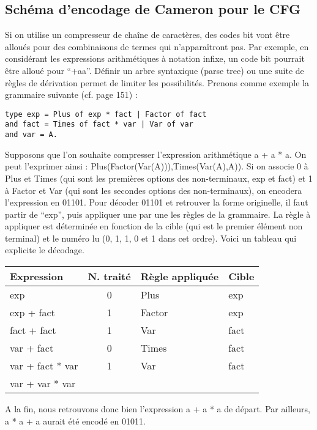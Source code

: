 \documentclass[titlepage]{article}
\begin{document}
\subsection{Schéma d'encodage de Cameron pour le CFG}

Si on utilise un compresseur de chaîne de caractères, des codes bit vont être alloués pour des combinaisons de termes qui n'apparaîtront pas. Par exemple, en considérant les expressions arithmétiques à notation infixe, un code bit pourrait être alloué pour ``+aa''.
Définir un arbre syntaxique (parse tree) ou une suite de règles de dérivation permet de limiter les possibilités.
Prenons comme exemple la grammaire suivante (cf. page 151) :
\begin{lstlisting}
type exp = Plus of exp * fact | Factor of fact
and fact = Times of fact * var | Var of var
and var = A.
\end{lstlisting} 
Supposons que l'on souhaite compresser l'expression arithmétique a + a * a. On peut l'exprimer ainsi : Plus(Factor(Var(A))),Times(Var(A),A)). Si on associe 0 à Plus et Times (qui sont les premières options des non-terminaux, exp et fact) et 1 à Factor et Var (qui sont les secondes options des non-terminaux), on encodera l'expression en 01101. Pour décoder 01101 et retrouver la forme originelle, il faut partir de ``exp'', puis appliquer une par une les règles de la grammaire. La règle à appliquer est déterminée en fonction de la cible (qui est le premier élément non terminal) et le numéro lu (0, 1, 1, 0 et 1 dans cet ordre). Voici un tableau qui explicite le décodage.
\begin{center}
   \begin{tabular}{ | l | c | l | l | }
     \hline
     Expression & N. traité & Règle appliquée & Cible \\ \hline
     exp & 0 & Plus & exp \\ \hline
     exp + fact & 1 & Factor & exp \\ \hline
     fact + fact & 1 & Var & fact \\ \hline
     var + fact & 0 & Times & fact \\ \hline
     var + fact * var & 1 & Var & fact \\ \hline
     var + var * var & &  & \\
     \hline
   \end{tabular}
 \end{center}

A la fin, nous retrouvons donc bien l'expression a + a * a de départ. Par ailleurs, a * a + a aurait été encodé en 01011.
\end{document}
